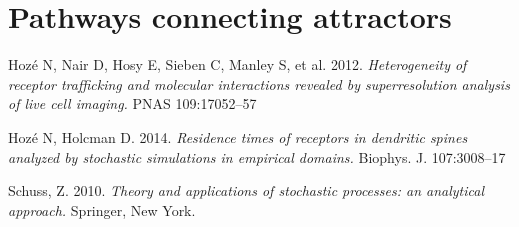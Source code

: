 \documentclass[a4paper]{article}
\begin{document}
\section{Pathways connecting attractors}




\begin{thebibliography}{9}
Hoz\'e N, Nair D, Hosy E, Sieben C, Manley S, et al. 2012. \textit{Heterogeneity of receptor trafficking and molecular interactions revealed by superresolution analysis of live cell imaging.} PNAS 109:17052–57

Hoz\'e N, Holcman D. 2014. \textit{Residence times of receptors in dendritic spines analyzed by stochastic simulations in empirical domains.} Biophys. J. 107:3008–17

Schuss, Z. 2010. \textit{Theory and applications of stochastic processes: an analytical approach.} Springer, New York.

\end{thebibliography}
\end{document}
